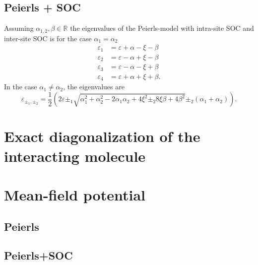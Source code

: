 \documentclass{article}
\begin{document}
\subsection{Peierls + SOC}
Assuming $\alpha_{1,2},\beta \in \mathds{R}$ the eigenvalues of the Peierls-model with intra-site SOC and inter-site SOC is for the case $\alpha_1=\alpha_2$
\begin{align}
	\varepsilon_1 &= \varepsilon + \alpha - \xi -\beta\\
	\varepsilon_2 &= \varepsilon - \alpha + \xi -\beta\\
	\varepsilon_3 &= \varepsilon - \alpha - \xi +\beta\\
	\varepsilon_4 &= \varepsilon + \alpha + \xi +\beta.
\end{align}
In the case $\alpha_1\neq \alpha_2$, the eigenvalues are
\begin{equation}
	\varepsilon_{\pm_1,\pm_2} = \frac{1}{2}(2\varepsilon \pm_1 \sqrt{\alpha_1^2 + \alpha_2^2 - 2\alpha_1\alpha_2 + 4\xi^2 \pm_2 8\xi\beta +4\beta^2} \pm_2(\alpha_1+\alpha_2)).
\end{equation}
\section{Exact diagonalization of the interacting molecule}
\section{Mean-field potential}
\subsection{Peierls}
\subsection{Peierls+SOC}
\end{document}
